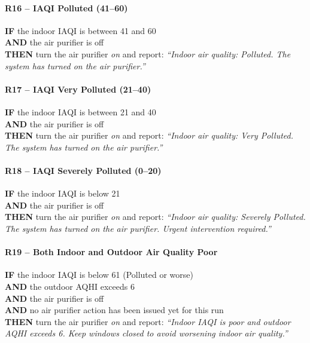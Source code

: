 \documentclass{article}
\begin{document}
\paragraph{R16 -- IAQI Polluted (41--60)}
\textbf{IF} the indoor IAQI is between 41 and 60 \\
\textbf{AND} the air purifier is off \\
\textbf{THEN} turn the air purifier \emph{on} and report: \textit{``Indoor air quality: Polluted. The system has turned on the air purifier.''}

\paragraph{R17 -- IAQI Very Polluted (21--40)}
\textbf{IF} the indoor IAQI is between 21 and 40 \\
\textbf{AND} the air purifier is off \\
\textbf{THEN} turn the air purifier \emph{on} and report: \textit{``Indoor air quality: Very Polluted. The system has turned on the air purifier.''}

\paragraph{R18 -- IAQI Severely Polluted (0--20)}
\textbf{IF} the indoor IAQI is below 21 \\
\textbf{AND} the air purifier is off \\
\textbf{THEN} turn the air purifier \emph{on} and report: \textit{``Indoor air quality: Severely Polluted. The system has turned on the air purifier. Urgent intervention required.''}

\paragraph{R19 -- Both Indoor and Outdoor Air Quality Poor}
\textbf{IF} the indoor IAQI is below 61 (Polluted or worse) \\
\textbf{AND} the outdoor AQHI exceeds 6 \\
\textbf{AND} the air purifier is off \\
\textbf{AND} no air purifier action has been issued yet for this run \\
\textbf{THEN} turn the air purifier \emph{on} and report: \textit{``Indoor IAQI is poor and outdoor AQHI exceeds 6. Keep windows closed to avoid worsening indoor air quality.''}




\end{document}
